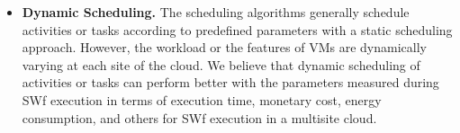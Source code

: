 \begin{itemize}
\item \textbf{Dynamic Scheduling.} The scheduling algorithms generally schedule activities or tasks according to predefined parameters with a static scheduling approach. However, the workload or the features of VMs are dynamically varying at each site of the cloud. We believe that dynamic scheduling of activities or tasks can perform better with the parameters measured during SWf execution in terms of execution time, monetary cost, energy consumption, and others for SWf execution in a multisite cloud. 
\end{itemize}



